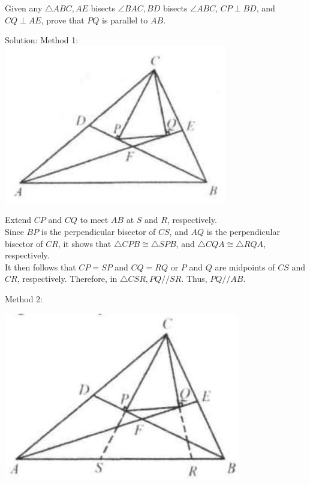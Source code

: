\documentclass{article}
\begin{document}
Given any \(\triangle A B C, A E\) bisects \(\angle B A C, B D\) bisects \(\angle A B C\), \(C P \perp B D\), and \(C Q \perp A E\), prove that \(P Q\) is parallel to \(A B\).

Solution:
Method 1:\\
\centering
\includegraphics[width=\textwidth]{images/058(2).jpg}


Extend \(C P\) and \(C Q\) to meet \(A B\) at \(S\) and \(R\), respectively.\\
Since \(B P\) is the perpendicular bisector of \(C S\), and \(A Q\) is the perpendicular bisector of \(C R\), it shows that \(\triangle C P B \cong \triangle S P B\), and \(\triangle C Q A \cong \triangle R Q A\), respectively.\\
It then follows that \(C P=S P\) and \(C Q=R Q\) or \(P\) and \(Q\) are midpoints of \(C S\) and \(C R\), respectively. Therefore, in \(\triangle C S R, P Q / / S R\). Thus, \(P Q / / A B\).

Method 2:
\begin{center}
\includegraphics[width=\textwidth]{images/059(3).jpg}
\end{center}
\end{document}
